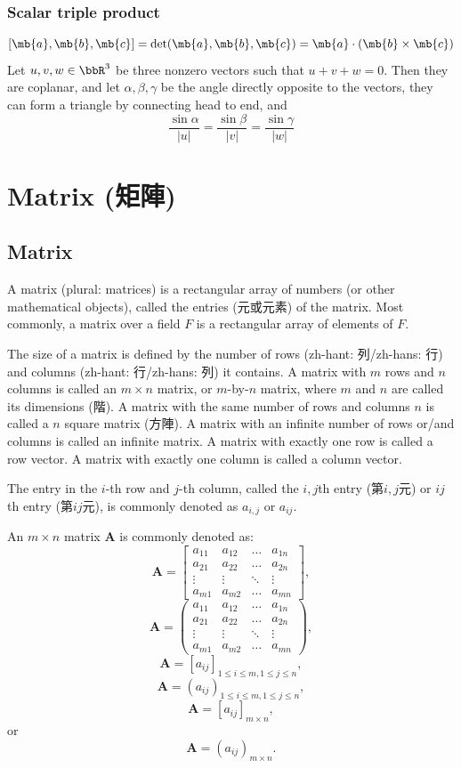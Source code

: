 \documentclass[a4paper,12pt]{report}
\begin{document}
\subsubsection{Scalar triple product}
\[[\mb{a},\mb{b},\mb{c}]=\det(\mb{a},\mb{b},\mb{c})=\mb{a}\cdot(\mb{b}\times\mb{c})\]
Let $u,v,w\in\bbR^3$ be three nonzero vectors such that $u+v+w=0$. Then they are coplanar, and let $\alpha,\beta,\gamma$ be the angle directly opposite to the vectors, they can form a triangle by connecting head to end, and
\[\frac{\sin\alpha}{|u|}=\frac{\sin\beta}{|v|}=\frac{\sin\gamma}{|w|}\]
\section{Matrix (矩陣)}
\subsection{Matrix}
A matrix (plural: matrices) is a rectangular array of numbers (or other mathematical objects), called the entries (元或元素) of the matrix. Most commonly, a matrix over a field $F$ is a rectangular array of elements of $F$.

The size of a matrix is defined by the number of rows (zh-hant: 列/zh-hans: 行) and columns (zh-hant: 行/zh-hans: 列) it contains. A matrix with $m$ rows and $n$ columns is called an $m\times n$ matrix, or $m$-by-$n$ matrix, where $m$ and $n$ are called its dimensions (階). A matrix with the same number of rows and columns $n$ is called a $n$ square matrix (方陣). A matrix with an infinite number of rows or/and columns is called an infinite matrix. A matrix with exactly one row is called a row vector. A matrix with exactly one column is called a column vector.

The entry in the $i$-th row and $j$-th column, called the $i,j$th entry (第$i,j$元) or $ij$th entry (第$ij$元), is commonly denoted as $a_{i,j}$ or $a_{ij}$.

An $m\times n$ matrix $\mathbf{A}$ is commonly denoted as:
\[\mathbf{A}=\begin{bmatrix}a_{11} & a_{12} & \ldots & a_{1n}\\a_{21} & a_{22} & \ldots & a_{2n}\\\vdots & \vdots & \ddots & \vdots\\a_{m1} & a_{m2} & \ldots & a_{mn}\end{bmatrix},\]
\[\mathbf{A}=\begin{pmatrix}a_{11} & a_{12} & \ldots & a_{1n}\\a_{21} & a_{22} & \ldots & a_{2n}\\\vdots & \vdots & \ddots & \vdots\\a_{m1} & a_{m2} & \ldots & a_{mn}\end{pmatrix},\]
\[\mathbf{A}=[a_{ij}]_{1\leq i\leq m,1\leq j\leq n},\]
\[\mathbf{A}=(a_{ij})_{1\leq i\leq m,1\leq j\leq n},\]
\[\mathbf{A}=[a_{ij}]_{m\times n},\]
or
\[\mathbf{A}=(a_{ij})_{m\times n}.\]
\end{document}

